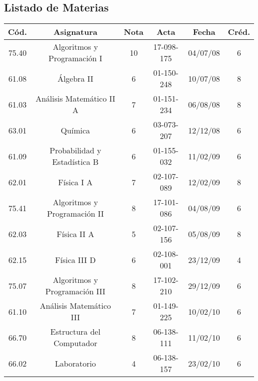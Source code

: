     \subsection{Listado de Materias}
        \begin{center}
        \hspace*{-1cm}
        \begin{tabular}{|c|c|c|c|c|c|}
            \hline
            \textbf{Cód.} & \textbf{Asignatura} & \textbf{Nota} & \textbf{Acta} & \textbf{Fecha} & \textbf{Créd.} \\ 
            \hline
            75.40 & Algoritmos y Programación I                & 10 & 17-098-175 & 04/07/08 & 6 \\
            \hline
            61.08 & Álgebra II                                 & 6  & 01-150-248 & 10/07/08 & 8 \\
            \hline
            61.03 & Análisis Matemático II A                   & 7  & 01-151-234 & 06/08/08 & 8 \\
            \hline
            63.01 & Química                                    & 6  & 03-073-207 & 12/12/08 & 6 \\
            \hline
            61.09 & Probabilidad y Estadística B               & 6  & 01-155-032 & 11/02/09 & 6 \\
            \hline
            62.01 & Física I A                                 & 7  & 02-107-089 & 12/02/09 & 8 \\
            \hline
            75.41 & Algoritmos y Programación II               & 8  & 17-101-086 & 04/08/09 & 6 \\
            \hline 
            62.03 & Física II A                                & 5  & 02-107-156 & 05/08/09 & 8 \\
            \hline
            62.15 & Física III D                               & 6  & 02-108-001 & 23/12/09 & 4 \\
            \hline
            75.07 & Algoritmos y Programación III              & 8  & 17-102-210 & 29/12/09 & 6 \\
            \hline
            61.10 & Análisis Matemático III                    & 7  & 01-149-225 & 10/02/10 & 6 \\
            \hline 
            66.70 & Estructura del Computador                  & 8  & 06-138-111 & 11/02/10 & 6 \\
            \hline
            66.02 & Laboratorio                                & 4  & 06-138-157 & 23/02/10 & 6 \\

\end{tabular}
\end{center}
